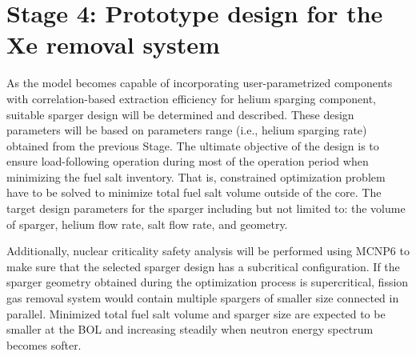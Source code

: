 \section{Stage 4: Prototype design for the Xe removal system}
As the model becomes capable of incorporating user-parametrized components 
with correlation-based extraction efficiency for helium sparging component, 
suitable sparger design will be determined and described. These design 
parameters will be based on parameters range (i.e., helium sparging rate) 
obtained from the previous Stage. The ultimate objective of the design is to 
ensure load-following operation during most of the operation period when 
minimizing the fuel salt inventory. That is, constrained optimization problem 
have to be solved to minimize total fuel salt volume outside of the core. The 
target design parameters for the sparger including but not limited to: the 
volume of sparger, helium flow rate, salt flow rate, and geometry.

Additionally, nuclear criticality safety analysis will be performed using 
MCNP6 \cite{werner_mcnp6._2018} to make sure that the selected sparger design 
has a subcritical configuration. If the sparger geometry obtained during the 
optimization process is supercritical, fission gas removal system would 
contain multiple spargers of smaller size connected in parallel. Minimized 
total fuel salt volume and sparger size are expected to be smaller at the 
\gls{BOL} and increasing steadily when neutron energy spectrum becomes softer.

